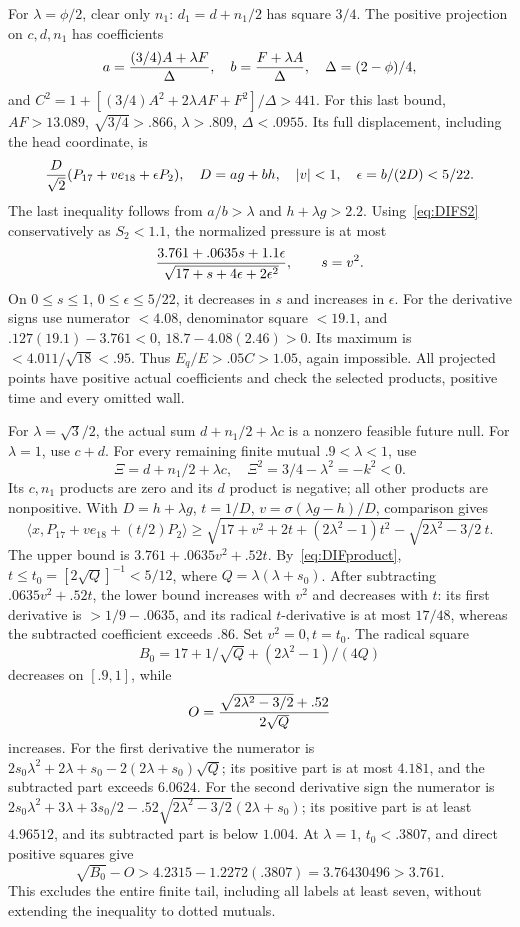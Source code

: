 \documentclass[11pt]{article}
\theoremstyle{definition}
\theoremstyle{remark}
\newcommand{\ip}[2]{\langle #1,#2\rangle}
\begin{document}
For \(\lambda=\phi/2\), clear only \(n_1\):
\(d_1=d+n_1/2\) has square \(3/4\).
The positive projection on \(c,d,n_1\) has coefficients
\[
 a={(3/4)A+\lambda F\over\Delta},\quad
 b={F+\lambda A\over\Delta},\quad
 \Delta=(2-\phi)/4,
\]
and
\(C^2=1+[(3/4)A^2+2\lambda AF+F^2]/\Delta>441\).
For this last bound, \(AF>13.089\),
\(\sqrt{3/4}>.866\), \(\lambda>.809\), \(\Delta<.0955\).
Its full displacement, including the head coordinate, is
\[
 {D\over\sqrt2}
   (P_{17}+ve_{18}+\epsilon P_2),\quad
 D=ag+bh,\quad |v|<1,\quad \epsilon=b/(2D)<5/22.
\]
The last inequality follows from \(a/b>\lambda\) and
\(h+\lambda g>2.2\).
Using~\eqref{eq:DIFS2} conservatively as \(S_2<1.1\),
the normalized pressure is at most
\[
 {3.761+.0635s+1.1\epsilon
       \over\sqrt{17+s+4\epsilon+2\epsilon^2}},\qquad s=v^2.
\]
On \(0\le s\le1\), \(0\le\epsilon\le5/22\), it decreases
in \(s\) and increases in \(\epsilon\).
For the derivative signs use numerator \(<4.08\),
denominator square \(<19.1\), and
\(.127(19.1)-3.761<0\),
\(18.7-4.08(2.46)>0\).
Its maximum is \(<4.011/\sqrt{18}<.95\).
Thus \(E_q/E>.05C>1.05\), again impossible.
All projected points have positive actual coefficients and check
the selected products, positive time and every omitted wall.

For \(\lambda=\sqrt3/2\), the actual sum
\(d+n_1/2+\lambda c\) is a nonzero feasible future null.
For \(\lambda=1\), use \(c+d\).
For every remaining finite mutual \(.9<\lambda<1\), use
\[
 \Xi=d+n_1/2+\lambda c,\quad
 \Xi^2=3/4-\lambda^2=-k^2<0 .
\]
Its \(c,n_1\) products are zero and its \(d\) product is negative;
all other products are nonpositive.
With \(D=h+\lambda g\), \(t=1/D\),
\(v=\sigma(\lambda g-h)/D\), comparison gives
\[
 \ip x{P_{17}+ve_{18}+(t/2)P_2}
 \ge\sqrt{17+v^2+2t+(2\lambda^2-1)t^2}
                         -\sqrt{2\lambda^2-3/2}\,t .
\]
The upper bound is
\(3.761+.0635v^2+.52t\).
By~\eqref{eq:DIFproduct},
\(t\le t_0=[2\sqrt{Q}]^{-1}<5/12\), where
\(Q=\lambda(\lambda+s_0)\).
After subtracting \(.0635v^2+.52t\), the lower bound increases
with \(v^2\) and decreases with \(t\):
its first derivative is \(>1/9-.0635\), and its radical
\(t\)-derivative is at most \(17/48\), whereas the subtracted
coefficient exceeds \(.86\).
Set \(v^2=0,t=t_0\).
The radical square
\[
 B_0=17+1/\sqrt Q+(2\lambda^2-1)/(4Q)
\]
decreases on \([.9,1]\), while
\[
 O={\sqrt{2\lambda^2-3/2}+.52\over2\sqrt Q}
\]
increases.
For the first derivative the numerator is
\(2s_0\lambda^2+2\lambda+s_0
 -2(2\lambda+s_0)\sqrt Q\);
its positive part is at most \(4.181\), and the subtracted
part exceeds \(6.0624\).
For the second derivative sign the numerator is
\(2s_0\lambda^2+3\lambda+3s_0/2
 -.52\sqrt{2\lambda^2-3/2}(2\lambda+s_0)\);
its positive part is at least \(4.96512\), and its subtracted
part is below \(1.004\).
At \(\lambda=1\), \(t_0<.3807\), and direct positive squares give
\[
 \sqrt{B_0}-O>
 4.2315-1.2272(.3807)=3.76430496>3.761 .
\]
This excludes the entire finite tail, including all labels at least
seven, without extending the inequality to dotted mutuals.
\end{document}
